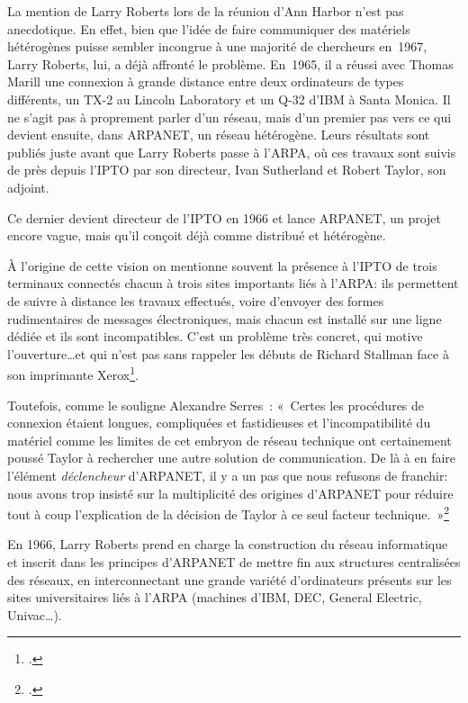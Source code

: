 \documentclass{FramateX}
\begin{document}
\begin{refsection}
La mention de Larry Roberts lors de la réunion d'Ann
Harbor n'est pas anecdotique. En effet, bien que
l'idée de faire communiquer des matériels hétérogènes
puisse sembler incongrue à une majorité de chercheurs en~1967, Larry
Roberts, lui, a déjà affronté le problème. En~1965, il a réussi avec
Thomas Marill une connexion à grande distance entre deux ordinateurs de
types différents, un TX-2 au Lincoln Laboratory et un Q-32
d'IBM à Santa Monica. Il ne s'agit
pas à proprement parler d'un réseau, mais
d'un premier pas vers ce qui devient ensuite, dans
ARPANET, un réseau hétérogène. Leurs résultats sont
publiés juste avant que Larry Roberts passe à l'ARPA,
où ces travaux sont suivis de près depuis l'IPTO par
son directeur, Ivan Sutherland et Robert Taylor, son adjoint. 

Ce dernier devient directeur de l'IPTO en 1966 et lance
ARPANET, un projet encore vague, mais qu'il conçoit
déjà comme distribué et hétérogène. 

À l'origine de cette vision on mentionne souvent la
présence à l'IPTO de trois terminaux connectés chacun
à trois sites importants liés à l'ARPA: ils
permettent de suivre à distance les travaux effectués, voire
d'envoyer des formes rudimentaires de messages
électroniques, mais chacun est installé sur une ligne dédiée et ils
sont incompatibles. C'est un problème très concret,
qui motive l'ouverture\ldots et qui
n'est pas sans rappeler les débuts de Richard Stallman
face à son imprimante Xerox\footnote{\cite[chap.~1]{williamsrichard2010}.}.


Toutefois, comme le souligne Alexandre Serres~: «~Certes les procédures
de connexion étaient longues, compliquées et fastidieuses et
l'incompatibilité du matériel comme les limites de cet
embryon de réseau technique ont certainement poussé Taylor à rechercher
une autre solution de communication. De là à en faire
l'élément  \textit{déclencheur} d'ARPANET, il y a un pas que nous refusons de franchir: nous avons trop insisté sur la multiplicité des origines d'ARPANET pour réduire tout à coup
l'explication de la décision de Taylor à ce seul
facteur technique.~»\footnote{\cite[p.~397]{serresaux2000}.}

En 1966, Larry Roberts prend en charge la construction du réseau
informatique et inscrit dans les principes d'ARPANET
de mettre fin aux structures centralisées des réseaux, en
interconnectant une grande variété d'ordinateurs
présents sur les sites universitaires liés à l'ARPA
(machines d'IBM, DEC, General Electric, Univac\ldots). 


\end{refsection}
\end{document}
